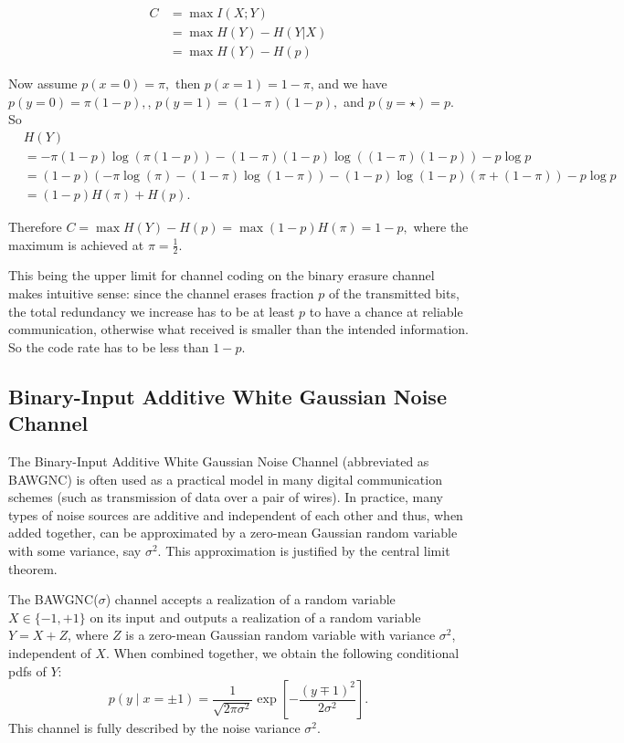 \begin{align*}
C &= \max I(X;Y) \\
  &= \max H(Y) - H(Y|X) \\
  &= \max H(Y) - H(p) 
\end{align*}

Now assume \(p(x= 0) = \pi,\) then \(p(x=1) = 1- \pi\), and we have \(p(y=0) = \pi (1-p), \), \(p(y=1) = (1-\pi) (1-p), \) and \(p(y=\star)= p.\)
So 
\begin{align*}
    & H(Y) \\
    &= - \pi (1-p) \log (\pi (1-p)) - (1-\pi) (1-p) \log ((1-\pi) (1-p)) - p \log p \\
    &= (1-p)(-\pi \log (\pi) - (1-\pi)  \log (1-\pi)) - (1-p) \log (1-p)(\pi + (1-\pi))  - p \log p\\
         &= (1-p) H(\pi) + H(p). 
\end{align*}

Therefore \(C= \max H(Y) - H(p) = \max (1-p) H(\pi) = 1-p, \) where the maximum is achieved at \(\pi = \frac{1}{2}.\)

This being the upper limit for channel coding on the binary erasure channel makes intuitive sense: since the channel erases fraction \(p\) of the transmitted bits, the total redundancy we increase has to be at least \(p\) to have a chance at reliable communication, otherwise what received is smaller than the intended information. So the code rate has to be less than \(1-p.\) 


\subsection{Binary-Input Additive White Gaussian Noise Channel}
The Binary-Input Additive White Gaussian Noise Channel (abbreviated as BAWGNC) is often used as a practical model in many digital communication schemes (such as transmission of data over a pair of wires). In practice, many types of noise sources are additive and independent of each other and thus, when added together, can be approximated by a zero-mean Gaussian random variable with some variance, say \(\sigma^2\). This approximation is justified by the central limit theorem.

The BAWGNC(\(\sigma\)) channel accepts a realization of a random variable \(X \in \{-1, +1\}\) on its input and outputs a realization of a random variable \(Y = X + Z\), where \(Z\) is a zero-mean Gaussian random variable with variance \(\sigma^2\), independent of \(X\). When combined together, we obtain the following conditional pdfs of \(Y\):
\[p(y \mid x = \pm 1) = \frac{1}{\sqrt{2\pi\sigma^2}} \exp\left[-\frac{(y \mp 1)^2}{2\sigma^2}\right].\]
This channel is fully described by the noise variance \(\sigma^2\).

